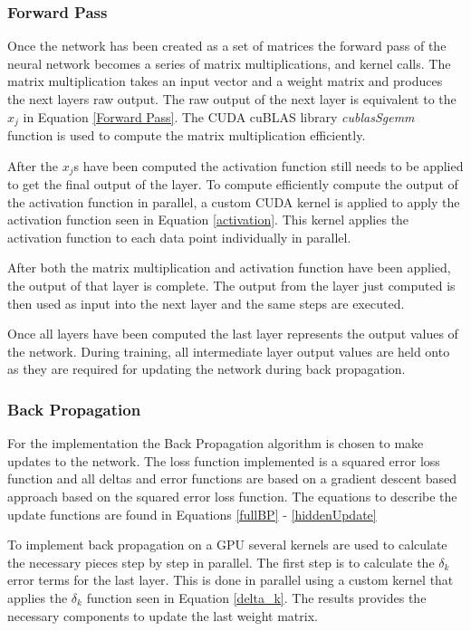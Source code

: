 \documentclass[jair, twoside,11pt,theapa]{article}
\begin{document}
\subsubsection{Forward Pass}
\label{FPSection}
Once the network has been created as a set of matrices the forward pass of the neural network becomes a series of matrix multiplications, and kernel calls.
The matrix multiplication takes an input vector and a weight matrix and produces the next layers raw output. 
The raw output of the next layer is equivalent to the $x_j$ in Equation \ref{Forward Pass}. 
The CUDA cuBLAS library \textit{cublasSgemm} function is used to compute the matrix multiplication efficiently.

After the $x_j$s have been computed the activation function still needs to be applied to get the final output of the layer. 
To compute efficiently compute the output of the activation function in parallel, a custom CUDA kernel is applied to apply the activation function seen in Equation \ref{activation}.
This kernel applies the activation function to each data point individually in parallel. 

After both the matrix multiplication and activation function have been applied, the output of that layer is complete. 
The output from the layer just computed is then used as input into the next layer and the same steps are executed. 

Once all layers have been computed the last layer represents the output values of the network. 
During training, all intermediate layer output values are held onto as they are required for updating the network during back propagation. 

\subsubsection{Back Propagation}
For the implementation the Back Propagation algorithm is chosen to make updates to the network. 
The loss function implemented is a squared error loss function and all deltas and error functions are based on a gradient descent based approach based on the squared error loss function. 
The equations to describe the update functions are found in Equations \ref{fullBP} - \ref{hiddenUpdate}

To implement back propagation on a GPU several kernels are used to calculate the necessary pieces step by step in parallel. 
The first step is to calculate the $\delta_k$ error terms for the last layer.
This is done in parallel using a custom kernel that applies the $\delta_k$ function seen in Equation \ref{delta_k}. 
The results provides the necessary components to update the last weight matrix. 
\end{document}
